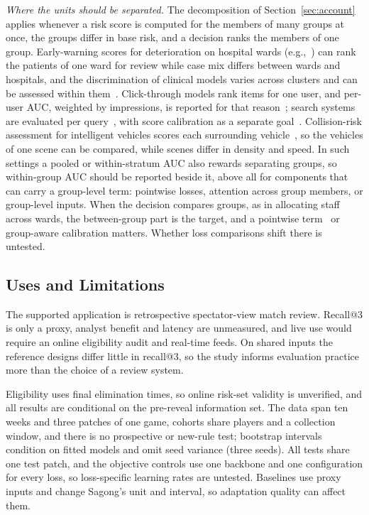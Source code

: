 \documentclass[sigconf,anonymous]{acmart}
\begin{document}
\emph{Where the units should be separated.} The decomposition of Section~\ref{sec:account} applies whenever a risk score is computed for the members of many groups at once, the groups differ in base risk, and a decision ranks the members of one group. Early-warning scores for deterioration on hospital wards (e.g.,~\cite{Churpek16}) can rank the patients of one ward for review while case mix differs between wards and hospitals, and the discrimination of clinical models varies across clusters and can be assessed within them~\cite{vanKlaveren14,Riley16}. Click-through models rank items for one user, and per-user AUC, weighted by impressions, is reported for that reason~\cite{Zhou18}; search systems are evaluated per query~\cite{Jarvelin02}, with score calibration as a separate goal~\cite{Yan22,Bai23}. Collision-risk assessment for intelligent vehicles scores each surrounding vehicle~\cite{Lefevre14}, so the vehicles of one scene can be compared, while scenes differ in density and speed. In such settings a pooled or within-stratum AUC also rewards separating groups, so within-group AUC should be reported beside it, above all for components that can carry a group-level term: pointwise losses, attention across group members, or group-level inputs. When the decision compares groups, as in allocating staff across wards, the between-group part is the target, and a pointwise term~\cite{Bai23} or group-aware calibration matters. Whether loss comparisons shift there is untested.

\subsection{Uses and Limitations}
\label{sec:discussion:limits}
The supported application is retrospective spectator-view match review. Recall@3 is only a proxy, analyst benefit and latency are unmeasured, and live use would require an online eligibility audit and real-time feeds. On shared inputs the reference designs differ little in recall@3, so the study informs evaluation practice more than the choice of a review system.

Eligibility uses final elimination times, so online risk-set validity is unverified, and all results are conditional on the pre-reveal information set. The data span ten weeks and three patches of one game, cohorts share players and a collection window, and there is no prospective or new-rule test; bootstrap intervals condition on fitted models and omit seed variance (three seeds). All tests share one test patch, and the objective controls use one backbone and one configuration for every loss, so loss-specific learning rates are untested. Baselines use proxy inputs and change Sagong's unit and interval, so adaptation quality can affect them.
\end{document}
